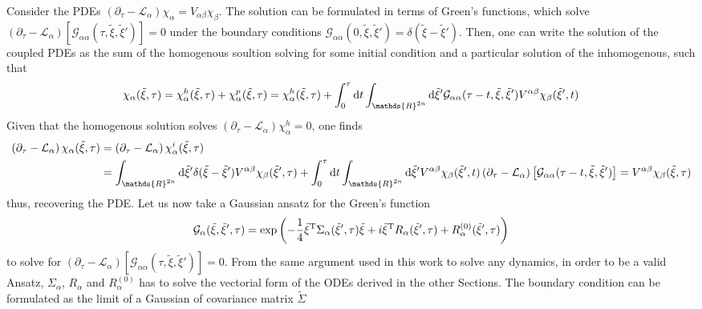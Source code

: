 \documentclass[%
reprint,
superscriptaddress,
nofootinbib,
 amsmath,amssymb,
prx,
floatfix,
]{revtex4-2}
\begin{document}
Consider the PDEs $\left( \partial_\tau - \mathcal{L}_{\alpha} \right) \chi_{\alpha} = V_{\alpha \beta} \chi_{\beta}$. The solution can be formulated in terms of Green's functions, which solve $\left( \partial_\tau - \mathcal{L}_{\alpha} \right) \left[\mathcal{G}_{\alpha \alpha} (\tau,  \tilde{\xi}, \tilde{\xi}') \right]  =0$ under the boundary conditions $\mathcal{G}_{\alpha \alpha} (0,  \tilde{\xi}, \tilde{\xi}') = \delta( \tilde{\xi}- \tilde{\xi}')$. Then, one can write the solution of the coupled PDEs as the sum of the homogenous soultion solving for some initial condition and a particular solution of the inhomogenous, such that 
\begin{equation}
    \chi_\alpha (\tilde{\xi}, \tau) = \chi^h_\alpha (\tilde{\xi}, \tau) +\chi^p_\alpha (\tilde{\xi}, \tau) =\chi^h_\alpha (\tilde{\xi}, \tau) +  \int_0^{\tau} {\rm d} t \int_{\mathds{R}^{2n}} {\rm d} \tilde{\xi}'  \mathcal{G}_{\alpha \alpha} (\tau - t,  \tilde{\xi}, \tilde{\xi}') V^{\alpha \beta} \chi_{\beta} (\tilde{\xi}', t)
\end{equation}
Given that the homogenous solution solves $\left( \partial_\tau - \mathcal{L}_{\alpha} \right) \chi^h_{\alpha} = 0$, one finds
\begin{align}
    \left( \partial_\tau - \mathcal{L}_{\alpha} \right) \chi_{\alpha} (\tilde{\xi}, \tau) &= \left( \partial_\tau - \mathcal{L}_{\alpha} \right)  \chi^i_\alpha (\tilde{\xi}, \tau) \nonumber\\  
    &=  \int_{\mathds{R}^{2n}} {\rm d} \tilde{\xi}' \delta(\tilde{\xi} - \tilde{\xi}') V^{\alpha \beta} \chi_{\beta} (\tilde{\xi}', \tau)  + \int_0^{\tau} {\rm d} t \int_{\mathds{R}^{2n}} {\rm d} \tilde{\xi}'  V^{\alpha \beta} \chi_{\beta} (\tilde{\xi}', t)  \left( \partial_\tau - \mathcal{L}_{\alpha} \right) \left[\mathcal{G}_{\alpha \alpha} (\tau - t,  \tilde{\xi}, \tilde{\xi}') \right] = V^{\alpha \beta} \chi_{\beta} (\tilde{\xi}, \tau) \nonumber
\end{align}
thus, recovering the PDE. Let us now take a Gaussian ansatz for the Green's function
\begin{equation}
    \mathcal{G}_\alpha(\tilde{\xi}, \tilde{\xi}', \tau) =   \exp \left( -\frac{1}{4} \tilde{\xi}^{\rm T} \Sigma_\alpha (\tilde{\xi}',  \tau) \tilde{\xi}  +  i  \tilde{\xi}^{\rm T} R_\alpha (\tilde{\xi}', \tau) +R^{(0)}_\alpha (\tilde{\xi}', \tau)\right) 
\end{equation}
to solve for $\left( \partial_\tau - \mathcal{L}_{\alpha} \right) \left[\mathcal{G}_{\alpha \alpha} (\tau,  \tilde{\xi}, \tilde{\xi}') \right]  =0$. From the same argument used in this work to solve any dynamics, in order to be a valid Ansatz, $\Sigma_\alpha$, $R_\alpha$ and $R^{(0)}_\alpha$ has to solve the vectorial form of the ODEs derived in the other Sections. The boundary condition can be formulated as the limit of a Gaussian of covariance matrix $\tilde{\Sigma}$
\end{document}
